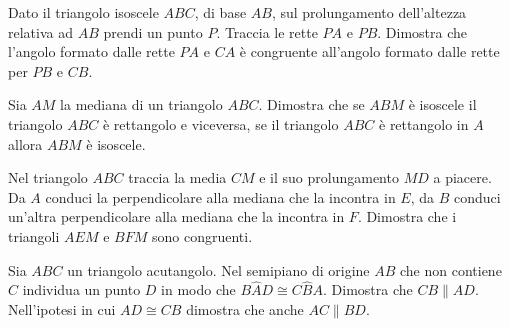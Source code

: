 \begin{multicols}{2}
\begin{esercizio}
\label{ese:3.70}
Dato il triangolo isoscele \(ABC\), di base \(AB\), sul prolungamento 
dell'altezza relativa ad \(AB\) prendi un punto \(P\). Traccia le rette 
\(PA\) e \(PB\). Dimostra che l'angolo formato dalle rette \(PA\) e \(CA\) è 
congruente all'angolo formato dalle rette per \(PB\) e \(CB\).
\end{esercizio}

\begin{esercizio}
\label{ese:3.74}
Sia \(AM\) la mediana di un triangolo \(ABC\). Dimostra che se \(ABM\) è 
isoscele il triangolo \(ABC\) è rettangolo e viceversa, se il triangolo 
\(ABC\) è rettangolo in \(A\) allora \(ABM\) è isoscele.
\end{esercizio}

\begin{esercizio}
\label{ese:3.78}
Nel triangolo \(ABC\) traccia la media \(CM\) e il suo prolungamento \(MD\) 
a piacere. Da \(A\) conduci la perpendicolare alla mediana che la 
incontra in \(E\), da \(B\) conduci un'altra perpendicolare alla mediana 
che la incontra in \(F\). Dimostra che i triangoli \(AEM\) e \(BFM\) sono 
congruenti.
\end{esercizio}

\begin{esercizio}
\label{ese:3.81}
Sia \(ABC\) un triangolo acutangolo. Nel semipiano di origine \(AB\) che 
non contiene \(C\) individua un punto \(D\) in modo che 
\(B\widehat{A}D\cong C\widehat{B}A\). Dimostra che \(CB\parallel AD\). 
Nell'ipotesi in cui \(AD\cong CB\) dimostra che anche \(AC\parallel BD\).
\end{esercizio}

\end{multicols}


\subsubsection*{}

